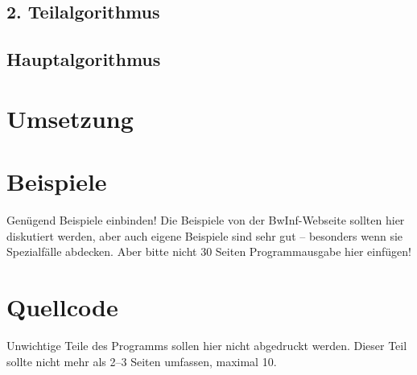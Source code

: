 \documentclass[a4paper,10pt,ngerman]{scrartcl}
\begin{document}
\subsection{2. Teilalgorithmus}
\subsection{Hauptalgorithmus}
\section{Umsetzung}

\section{Beispiele}
Genügend Beispiele einbinden! Die Beispiele von der BwInf-Webseite sollten hier diskutiert werden, aber auch eigene Beispiele sind sehr gut – besonders wenn sie Spezialfälle abdecken. Aber bitte nicht 30 Seiten Programmausgabe hier einfügen!

\section{Quellcode}
Unwichtige Teile des Programms sollen hier nicht abgedruckt werden. Dieser Teil sollte nicht mehr als 2–3 Seiten umfassen, maximal 10.
\end{document}
